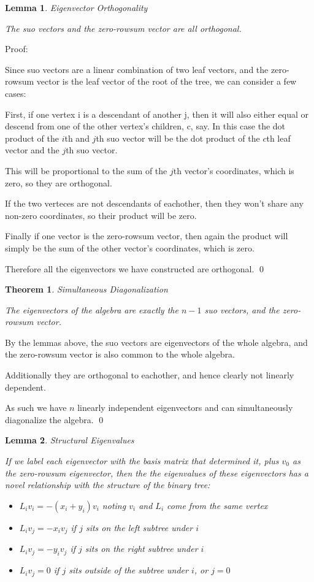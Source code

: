 \documentclass[10pt,a4paper]{report}
\newtheorem{theorem}{Theorem}
\newtheorem{lemma}{Lemma}
\begin{document}
\begin{lemma} Eigenvector Orthogonality

	The suo vectors and the zero-rowsum vector are all orthogonal.
\end{lemma}

Proof:

Since suo vectors are a linear combination of two leaf vectors, and the
zero-rowsum vector is the leaf vector of the root of the tree, we can consider
a few cases:

First, if one vertex i is a descendant of another j, then it will also either
equal or descend from one of the other vertex's children, c, say.  In this case
the dot product of the $i$th and $j$th suo vector will be the dot product of
the $c$th leaf vector and the $j$th suo vector.

This will be proportional to the sum of the $j$th vector's coordinates, which
is zero, so they are orthogonal.

If the two verteces are not descendants of eachother, then they won't share any
non-zero coordinates, so their product will be zero.

Finally if one vector is the zero-rowsum vector, then again the product will
simply be the sum of the other vector's coordinates, which is zero.

Therefore all the eigenvectors we have constructed are orthogonal. \qed{}

\begin{theorem} Simultaneous Diagonalization

	The eigenvectors of the algebra are exactly the $n-1$ suo vectors, and the
	zero-rowsum vector.
\end{theorem}

By the lemmas above, the suo vectors are eigenvectors of the whole algebra, and
the zero-rowsum vector is also common to the whole algebra.

Additionally they are orthogonal to eachother, and hence clearly not linearly
dependent.

As such we have $n$ linearly independent eigenvectors and can simultaneously
diagonalize the algebra. \qed{}

\begin{lemma} Structural Eigenvalues

	If we label each eigenvector with the basis matrix that determined it, plus
	$v_0$ as the zero-rowsum eigenvector, then the the eigenvalues of these
	eigenvectors has a novel relationship with the structure of the binary
	tree:
	\begin{itemize}
		\item ${L_i}{v_i} = -(x_i + y_i)v_i$ noting $v_i$ and $L_i$ come from
			the same vertex
		\item ${L_i}{v_j} = -{x_i}{v_j}$ if $j$ sits on the left subtree under
			$i$
		\item ${L_i}{v_j} = -{y_i}{v_j}$ if $j$ sits on the right subtree under
			$i$
		\item ${L_i}{v_j} = 0$ if $j$ sits outside of the subtree under $i$, or
			$j=0$
	\end{itemize}
\end{lemma}
\end{document}
